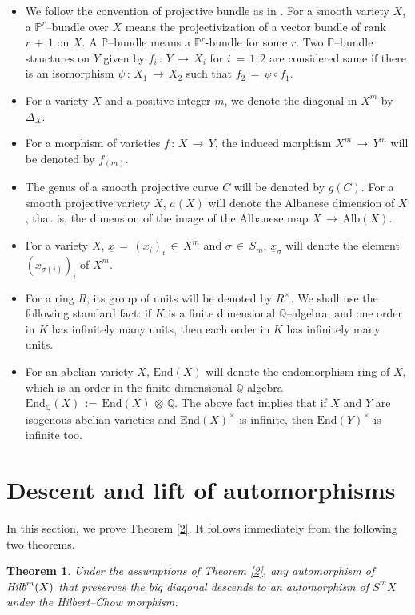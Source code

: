 \documentclass[12pt,reqno]{amsart}
\newtheorem{theorem}[lemma]{Theorem}
\theoremstyle{definition}
\numberwithin{equation}{section}
\begin{document}
\begin{itemize}
  \item  We follow the convention of projective bundle as in {\cite[Chapter 2, Section 7]{Hart}}. For a smooth variety $X$, a $\mathbb{P}^r$--bundle over $X$ means the projectivization of a vector bundle of rank $r\,+\,1$ on $X$. A $\mathbb{P}$--bundle means a $\mathbb{P}^r$-bundle for some $r.$ Two $\mathbb{P}$--bundle structures on $Y$ given by $f_i\,:\,Y\,\to\, X_i$ for $i\,=\,1,2$ are considered same if there is an isomorphism $\psi\,:\, X_1\,\to\, X_2$ such that $f_2\,=\,\psi\circ f_1.$
  \item For a variety $X$ and a positive integer $m$, we denote the diagonal in $X^m$ by $\Delta _X.$
  \item For a morphism of varieties $f\,:\,X\,\to\, Y$, the induced morphism $X^m\,\to\, Y^m$ will be denoted by $f_{(m)}.$
 
  \item The genus of a smooth projective curve $C$ will be denoted by $g(C).$ For a smooth projective variety $X$, $a(X)$ will denote the Albanese dimension of $X$, that is, the dimension of the image of the Albanese map $X\,\to\, \textrm{Alb}(X)$.
  \item For a variety $X$, $\underline{x}\,=\,(x_i)_i\,\in\, X^m$ and $\sigma\,\in\, S_m$, $\underline{x}_{\sigma}$ will denote the element $(x_{\sigma(i)})_i$ of $X^m.$
  \item For a ring $R$, its group of units will be denoted by $R^{\times}$. We shall use the following standard fact: if $K$ is a finite dimensional $\mathbb{Q}$--algebra, and one order in $K$ has infinitely many units, then each order in $K$ has infinitely many units.
  \item For an abelian variety $X$, $\textrm{End}(X)$ will denote the endomorphism ring of $X$, which is an order in the finite dimensional $\mathbb{Q}$-algebra $\textrm{End}_{\mathbb{Q}}(X)\,:=\,\textrm{End}(X)\,\otimes\, \mathbb{Q}$. The above fact implies that if $X$ and $Y$ are isogenous abelian varieties and $\textrm{End}(X)^{\times}$ is infinite, then $\textrm{End}(Y)^{\times}$ is infinite too.
\end{itemize}



 
\section {Descent and lift of automorphisms}
In this section, we prove Theorem \ref{2}. It follows immediately from the following two theorems.
\begin{theorem}\label{descent}
Under the assumptions of Theorem \ref{2}, any automorphism of $\emph{Hilb}^m(X)$ that preserves the big diagonal descends to an automorphism of $S^m X$ under the Hilbert--Chow morphism. 
\end{theorem}
\end{document}
